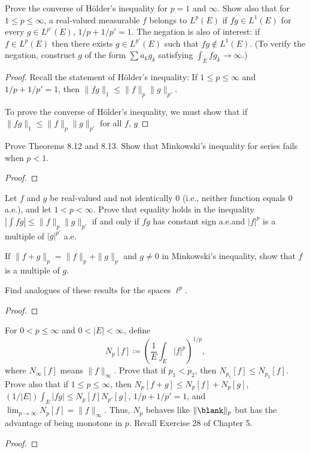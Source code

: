 
\begin{problem}
Prove the converse of Hölder's inequality for $p=1$ and $\infty$. Show also
that for $1\leq p\leq\infty$, a real-valued measurable $f$ belongs to
$L^p(E)$ if $fg\in L^1(E)$ for every $g\in L^{p'}(E)$, $1/p+1/p'=1$. The
negation is also of interest: if $f\in L^p(E)$ then there exists $g\in
L^{p'}(E)$ such that $fg\notin L^1(E)$. (To verify the negation, construct
$g$ of the form $\sum a_kg_k$ satisfying $\int_E fg_k\to\infty$.)
\end{problem}
\begin{proof}
Recall the statement of Hölder's inequality: If $1\leq p\leq \infty$ and
$1/p+1/p'=1$, then $\|fg\|_1\leq\|f\|_p\|g\|_{p'}$.

To prove the converse of Hölder's inequality, we must show that if
$\|fg\|_1\leq\|f\|_p\|g\|_{p'}$ for all $f$, $g$
\end{proof}
\newpage

\begin{problem}
Prove Theorems 8.12 and 8.13. Show that Minkowski’s inequality for series
fails when $p<1$.
\end{problem}
\begin{proof}
\end{proof}
\newpage

\begin{problem}
Let $f$ and $g$ be real-valued and not identically $0$ (i.e., neither
function equals $0$ a.e.), and let $1<p<\infty$. Prove that equality holds
in the inequality $\left|\int fg\right|\leq\|f\|_p\|g\|_{p'}$ if and only if
$fg$ has constant sign a.e.\@ and $|f|^p$ is a multiple of $|g|^{p'}$ a.e.

If $\|f+g\|_p=\|f\|_p+\|g\|_{p}$ and $g\neq 0$ in Minkowski's inequality,
show that $f$ is a multiple of $g$.

Find analogues of these results for the spaces $\ell^p$.
\end{problem}
\begin{proof}
\end{proof}
\newpage

\begin{problem}
For $0<p\leq\infty$ and $0<|E|<\infty$, define
\[
N_p[f]\coloneqq\left(\frac{1}{E}\int_E|f|^p\right)^{1/p},
\]
where $N_\infty[f]$ means $\|f\|_\infty$. Prove that if $p_1<p_2$, then
$N_{p_1}[f]\leq N_{p_2}[f]$. Prove also that if $1\leq p\leq \infty$, then
$N_p[f+g]\leq N_p[f]+N_p[g]$, $(1/|E|)\int_E|fg|\leq N_p[f]N_{p'}[g]$,
$1/p+1/p'=1$, and $\lim_{p\to\infty} N_p[f]=\|f\|_\infty$. Thus, $N_p$
behaves like $\|\blank\|_p$ but has the advantage of being monotone in
$p$. Recall Exercise 28 of Chapter 5.
\end{problem}
\begin{proof}
\end{proof}
\newpage


